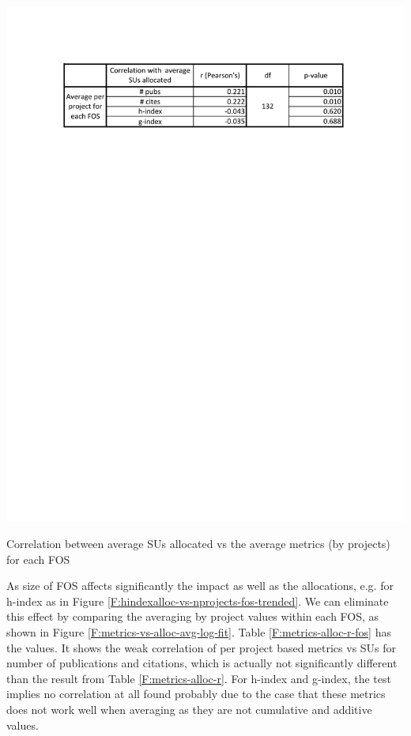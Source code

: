 \begin{table}[htb]
  \centering
    \includegraphics[width=1.0\columnwidth]{images/metrics_alloc_r_fos.pdf}
  \caption{Correlation between average SUs allocated vs the average metrics (by projects) for each FOS}\label{F:metrics-alloc-r-fos}
\end{table}

As size of FOS affects significantly the impact as well as the allocations, e.g. for h-index as in Figure \ref{F:hindexalloc-vs-nprojects-fos-trended}. We can eliminate this effect by comparing the averaging by project values within each FOS, as shown in Figure \ref{F:metrics-vs-alloc-avg-log-fit}. Table \ref{F:metrics-alloc-r-fos} has the values. It shows the weak correlation of per project based metrics vs SUs for number of publications and citations, which is actually not significantly different than the result from Table \ref{F:metrics-alloc-r}. For h-index and g-index, the test implies no correlation at all found probably due to the case that these metrics does not work well when averaging as they are not cumulative and additive values.

